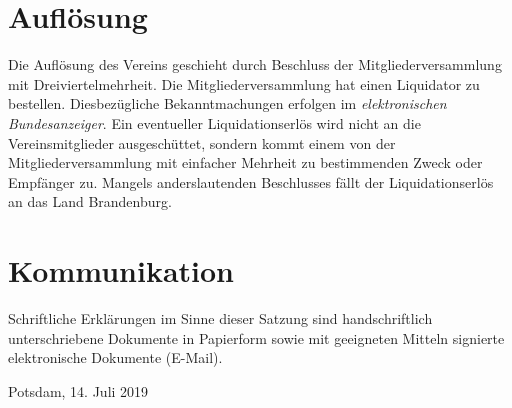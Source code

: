 \documentclass[a4paper, 10pt, headings=normal]{scrartcl}
\begin{document}
\begin{multicols}{2}
\section{Auflösung}
\label{par:aufloseung}

Die Auflösung des Vereins geschieht durch Beschluss der Mitgliederversammlung mit Dreiviertelmehrheit.
Die Mitgliederversammlung hat einen Liquidator zu bestellen.
Diesbezügliche Bekanntmachungen erfolgen im \emph{elektronischen Bundesanzeiger}.
Ein eventueller Liquidationserlös wird nicht an die Vereinsmitglieder ausgeschüttet, sondern kommt einem von der Mitgliederversammlung mit einfacher Mehrheit zu bestimmenden Zweck oder Empfänger zu.
Mangels anderslautenden Beschlusses fällt der Liquidationserlös an das Land Brandenburg.

\section{Kommunikation}
\label{par:kommunikation}

Schriftliche Erklärungen im Sinne dieser Satzung sind handschriftlich unterschriebene Dokumente in Papierform sowie mit geeigneten Mitteln signierte elektronische Dokumente (E-Mail).

\end{multicols}

\bigskip

\noindent Potsdam, 14. Juli 2019
\end{document}
